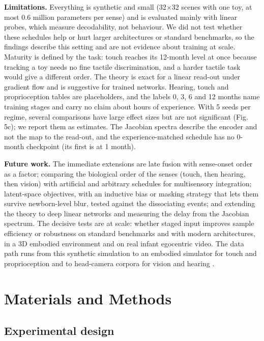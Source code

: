 \documentclass{article}
\begin{document}
\textbf{Limitations.} Everything is synthetic and small (32\ensuremath{\times}32 scenes with one toy, at most 0.6 million parameters per sense) and is evaluated mainly with linear probes, which measure decodability, not behaviour. We did not test whether these schedules help or hurt larger architectures or standard benchmarks, so the findings describe this setting and are not evidence about training at scale. Maturity is defined by the task: touch reaches its 12-month level at once because tracking a toy needs no fine tactile discrimination, and a harder tactile task would give a different order. The theory is exact for a linear read-out under gradient flow and is suggestive for trained networks. Hearing, touch and proprioception tables are placeholders, and the labels 0, 3, 6 and 12 months name training stages and carry no claim about hours of experience. With 5 seeds per regime, several comparisons have large effect sizes but are not significant (Fig. 5c); we report them as estimates. The Jacobian spectra describe the encoder and not the map to the read-out, and the experience-matched schedule has no 0-month checkpoint (its first is at 1 month).

\textbf{Future work.} The immediate extensions are late fusion with sense-onset order as a factor; comparing the biological order of the senses (touch, then hearing, then vision) with artificial and arbitrary schedules for multisensory integration; latent-space objectives, with an inductive bias or masking strategy that lets them survive newborn-level blur, tested against the dissociating events; and extending the theory to deep linear networks and measuring the delay from the Jacobian spectrum. The decisive tests are at scale: whether staged input improves sample efficiency or robustness on standard benchmarks and with modern architectures, in a 3D embodied environment and on real infant egocentric video. The data path runs from this synthetic simulation to an embodied simulator for touch and proprioception \autocite{mattern2024mimo} and to head-camera corpora for vision and hearing \autocite{sullivan2021saycam,long2024babyview}.


\section{Materials and Methods}

\hypertarget{experimental-design}{%
\subsection{Experimental design}\label{experimental-design}}
\end{document}
